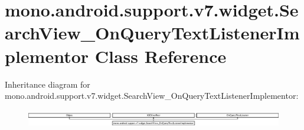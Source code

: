 \hypertarget{classmono_1_1android_1_1support_1_1v7_1_1widget_1_1SearchView__OnQueryTextListenerImplementor}{}\section{mono.\+android.\+support.\+v7.\+widget.\+Search\+View\+\_\+\+On\+Query\+Text\+Listener\+Implementor Class Reference}
\label{classmono_1_1android_1_1support_1_1v7_1_1widget_1_1SearchView__OnQueryTextListenerImplementor}
Inheritance diagram for mono.\+android.\+support.\+v7.\+widget.\+Search\+View\+\_\+\+On\+Query\+Text\+Listener\+Implementor\+:\begin{figure}[H]
\begin{center}
\leavevmode
\includegraphics[height=0.796020cm]{classmono_1_1android_1_1support_1_1v7_1_1widget_1_1SearchView__OnQueryTextListenerImplementor}
\end{center}
\end{figure}
